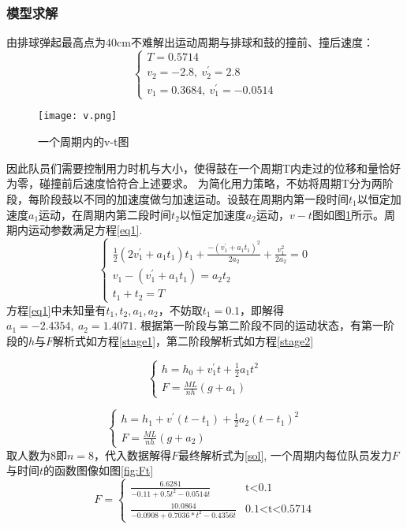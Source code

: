 \documentclass{cumcmthesis}
\begin{document}
\subsubsection{模型求解}
由排球弹起最高点为40cm不难解出运动周期与排球和鼓的撞前、撞后速度：
\begin{equation*}
\left\{
\begin{array}{lr}
T = 0.5714 \\
v_2 = -2.8,\ v_2^{'} = 2.8 \\
v_1 = 0.3684,\ v_1^{'} = -0.0514
\end{array}
\right.
\end{equation*}
\begin{figure}
	\centering
	\texttt{[image: v.png]}
	\caption{一个周期内的v-t图}
	\label{vt} %
\end{figure}
因此队员们需要控制用力时机与大小，使得鼓在一个周期T内走过的位移和量恰好为零，碰撞前后速度恰符合上述要求。
为简化用力策略，不妨将周期T分为两阶段，每阶段鼓以不同的加速度做匀加速运动。设鼓在周期内第一段时间$t_1$以恒定加速度$a_1$运动，在周期内第二段时间$t_2$以恒定加速度$a_2$运动，$v-t$图如图\ref{vt}所示。周期内运动参数满足方程\ref{eq1}.
\begin{equation}
\left\{
\begin{array}{lr}
\frac{1}{2}(2v_1^{'}+a_1t_1)t_1 + \frac{-(v_1^{'}+a_1t_1)^2}{2a_2}+\frac{v_1^2}{2a_2} = 0 \\
v_1-(v_1^{'}+a_1t_1) = a_2t_2 \\
t_1 + t_2 = T
\end{array}
\label{eq1}
\right.
\end{equation}
方程\ref{eq1}中未知量有$t_1, t_2, a_1, a_2$，不妨取$t_1=0.1$，即解得$a_1 = -2.4354,\ a_2 = 1.4071$.
根据第一阶段与第二阶段不同的运动状态，有第一阶段的$h$与$F$解析式如方程\ref{stage1}，第二阶段解析式如方程\ref{stage2}

\begin{equation}
\left\{
\begin{array}{lr}
h=h_0+v_1^{'}t+\frac{1}{2}a_1t^2\\
F=\frac{ML}{nh}(g+a_1)
\end{array}
\right.
\label{stage1}
\end{equation}

\begin{equation}
\left\{
\begin{array}{lr}
h=h_1+v^{'}(t-t_1)+\frac{1}{2}a_2(t-t_1)^2\\
F=\frac{ML}{nh}(g+a_2)
\end{array}
\right.
\label{stage2}
\end{equation}
取人数为8即$n=8$，代入数据解得$F$最终解析式为\ref{sol}, 一个周期内每位队员发力$F$与时间$t$的函数图像如图\ref{fig:Ft}
\begin{equation}
F=
\begin{cases}
\frac{6.6281}{-0.11+0.5t^2-0.0514t}& \text{t<0.1}\\
\frac{10.0864}{-0.0908+0.7036*t^2-0.4356t}& \text{0.1<t<0.5714}
\end{cases}
\label{sol}
\end{equation}
\end{document}
